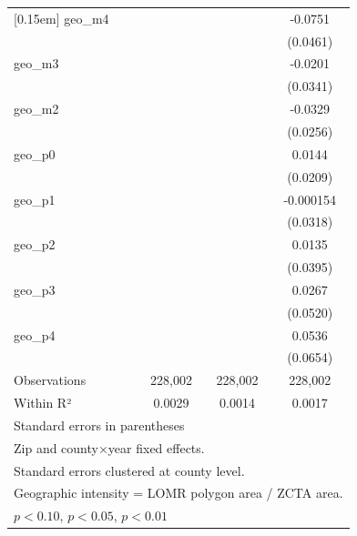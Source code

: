 \begin{table}[htbp]
\begin{tabular}{l*{3}{c}}
[0.15em]
geo\_m4              &                     &                     &     -0.0751         \\
                    &                     &                     &    (0.0461)         \\
[0.15em]
geo\_m3              &                     &                     &     -0.0201         \\
                    &                     &                     &    (0.0341)         \\
[0.15em]
geo\_m2              &                     &                     &     -0.0329         \\
                    &                     &                     &    (0.0256)         \\
[0.15em]
geo\_p0              &                     &                     &      0.0144         \\
                    &                     &                     &    (0.0209)         \\
[0.15em]
geo\_p1              &                     &                     &   -0.000154         \\
                    &                     &                     &    (0.0318)         \\
[0.15em]
geo\_p2              &                     &                     &      0.0135         \\
                    &                     &                     &    (0.0395)         \\
[0.15em]
geo\_p3              &                     &                     &      0.0267         \\
                    &                     &                     &    (0.0520)         \\
[0.15em]
geo\_p4              &                     &                     &      0.0536         \\
                    &                     &                     &    (0.0654)         \\
\hline
Observations        &     228,002         &     228,002         &     228,002         \\
Within R²           &      0.0029         &      0.0014         &      0.0017         \\
\hline\hline
\multicolumn{4}{l}{\footnotesize Standard errors in parentheses}\\
\multicolumn{4}{l}{\footnotesize Zip and county×year fixed effects.}\\
\multicolumn{4}{l}{\footnotesize Standard errors clustered at county level.}\\
\multicolumn{4}{l}{\footnotesize Geographic intensity = LOMR polygon area / ZCTA area.}\\
\multicolumn{4}{l}{\footnotesize \sym{*} \(p<0.10\), \sym{**} \(p<0.05\), \sym{***} \(p<0.01\)}\\
\end{tabular}
\end{table}
